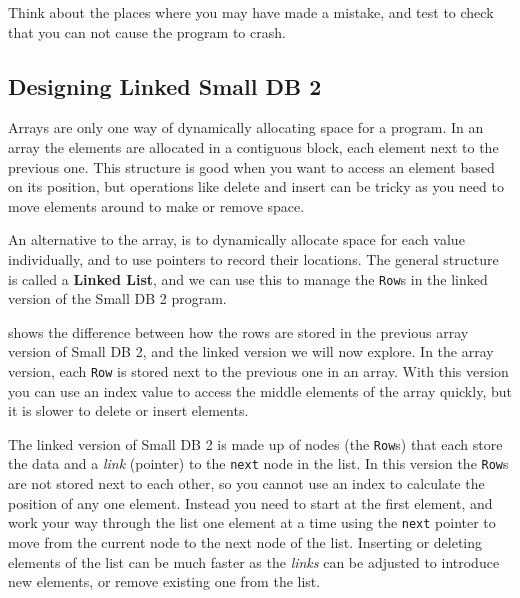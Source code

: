 Think about the places where you may have made a mistake, and test to check that you can not cause the program to crash. 




\clearpage
\subsection{Designing Linked Small DB 2} %
\label{sub:designing_linked_list}

Arrays are only one way of dynamically allocating space for a program. In an array the elements are allocated in a contiguous block, each element next to the previous one. This structure is good when you want to access an element based on its position, but operations like delete and insert can be tricky as you need to move elements around to make or remove space.

An alternative to the array, is to dynamically allocate space for each value individually, and to use pointers to record their locations. The general structure is called a \textbf{Linked List}, and we can use this to manage the \texttt{Row}s in the linked version of the Small DB 2 program.

 shows the difference between how the rows are stored in the previous array version of Small DB 2, and the linked version we will now explore. In the array version, each \texttt{Row} is stored next to the previous one in an array. With this version you can use an index value to access the middle elements of the array quickly, but it is slower to delete or insert elements. 

The linked version of Small DB 2 is made up of nodes (the \texttt{Row}s) that each store the data and a \emph{link} (pointer) to the \texttt{next} node in the list. In this version the \texttt{Row}s are not stored next to each other, so you cannot use an index to calculate the position of any one element. Instead you need to start at the first element, and work your way through the list one element at a time using the \texttt{next} pointer to move from the current node to the next node of the list. Inserting or deleting elements of the list can be much faster as the \emph{links} can be adjusted to introduce new elements, or remove existing one from the list.

